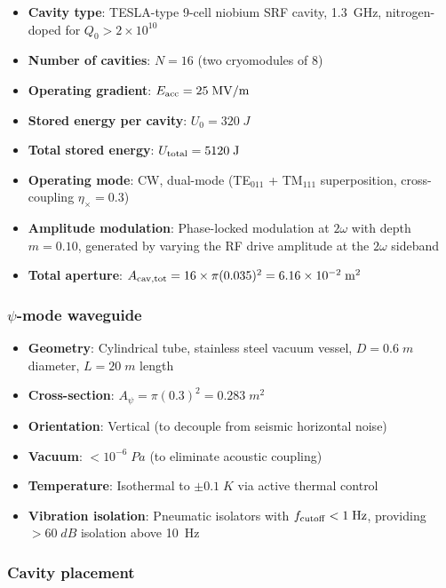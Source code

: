 \documentclass[aps,prd,twocolumn,superscriptaddress,floatfix,nofootinbib]{revtex4-2}
\begin{document}
\begin{itemize}[nosep]
\item \textbf{Cavity type}: TESLA-type 9-cell niobium SRF cavity,
1.3~GHz, nitrogen-doped for $Q_0 > 2\times10^{10}$
\item \textbf{Number of cavities}: $N = 16$ (two cryomodules of 8)
\item \textbf{Operating gradient}: $E_{\rm acc} = 25\;\si{MV/m}$
\item \textbf{Stored energy per cavity}: $U_0 = 320\;\si{J}$
\item \textbf{Total stored energy}: $U_{\rm total} = 5120\;\si{J}$
\item \textbf{Operating mode}: CW, dual-mode
(TE$_{011}$ + TM$_{111}$ superposition, cross-coupling
$\eta_\times = 0.3$)
\item \textbf{Amplitude modulation}: Phase-locked modulation at
$2\omega$ with depth $m = 0.10$, generated by varying the RF drive
amplitude at the $2\omega$ sideband
\item \textbf{Total aperture}: $A_{\rm cav,tot} = 16 \times
\pi(0.035)^2 = 6.16\times10^{-2}\;\si{m^2}$
\end{itemize}

\subsubsection{$\psi$-mode waveguide}

\begin{itemize}[nosep]
\item \textbf{Geometry}: Cylindrical tube, stainless steel vacuum
vessel, $D = 0.6\;\si{m}$ diameter, $L = 20\;\si{m}$ length
\item \textbf{Cross-section}: $A_\psi = \pi(0.3)^2 = 0.283\;\si{m^2}$
\item \textbf{Orientation}: Vertical (to decouple from seismic
horizontal noise)
\item \textbf{Vacuum}: $< 10^{-6}\;\si{Pa}$ (to eliminate acoustic
coupling)
\item \textbf{Temperature}: Isothermal to $\pm 0.1\;\si{K}$ via
active thermal control
\item \textbf{Vibration isolation}: Pneumatic isolators with
$f_{\rm cutoff} < 1\;\si{Hz}$, providing $> 60\;\si{dB}$ isolation
above 10~Hz
\end{itemize}

\subsubsection{Cavity placement}
\end{document}
